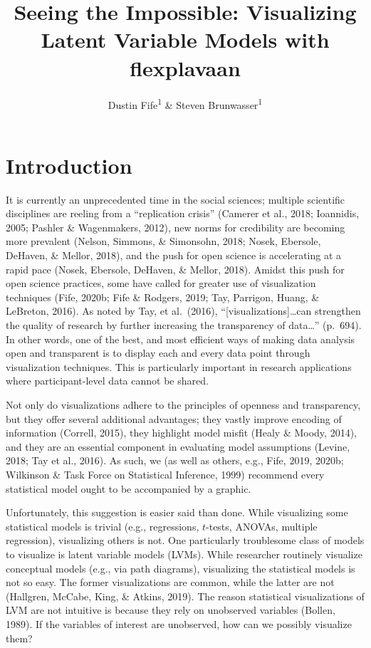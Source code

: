 \documentclass[
  english,
  doc]{apa6}
\title{Seeing the Impossible: Visualizing Latent Variable Models with flexplavaan}
\author{Dustin Fife\textsuperscript{1} \& Steven Brunwasser\textsuperscript{1}}
\date{}
\affiliation{\vspace{0.5cm}\textsuperscript{1} Rowan University}
\begin{document}
\maketitle

\hypertarget{introduction}{%
\section{Introduction}\label{introduction}}

It is currently an unprecedented time in the social sciences; multiple scientific disciplines are reeling from a ``replication crisis'' (Camerer et al., 2018; Ioannidis, 2005; Pashler \& Wagenmakers, 2012), new norms for credibility are becoming more prevalent (Nelson, Simmons, \& Simonsohn, 2018; Nosek, Ebersole, DeHaven, \& Mellor, 2018), and the push for open science is accelerating at a rapid pace (Nosek, Ebersole, DeHaven, \& Mellor, 2018). Amidst this push for open science practices, some have called for greater use of visualization techniques (Fife, 2020b; Fife \& Rodgers, 2019; Tay, Parrigon, Huang, \& LeBreton, 2016). As noted by Tay, et al.~(2016), ``{[}visualizations{]}\ldots can strengthen the quality of research by further increasing the transparency of data\ldots{}'' (p.~694). In other words, one of the best, and most efficient ways of making data analysis open and transparent is to display each and every data point through visualization techniques. This is particularly important in research applications where participant-level data cannot be shared.

Not only do visualizations adhere to the principles of openness and transparency, but they offer several additional advantages; they vastly improve encoding of information (Correll, 2015), they highlight model misfit (Healy \& Moody, 2014), and they are an essential component in evaluating model assumptions (Levine, 2018; Tay et al., 2016). As such, we (as well as others, e.g., Fife, 2019, 2020b; Wilkinson \& Task Force on Statistical Inference, 1999) recommend every statistical model ought to be accompanied by a graphic.

Unfortunately, this suggestion is easier said than done. While visualizing some statistical models is trivial (e.g., regressions, \(t\)-tests, ANOVAs, multiple regression), visualizing others is not. One particularly troublesome class of models to visualize is latent variable models (LVMs). While researcher routinely visualize conceptual models (e.g., via path diagrams), visualizing the statistical models is not so easy. The former visualizations are common, while the latter are not (Hallgren, McCabe, King, \& Atkins, 2019). The reason statistical visualizations of LVM are not intuitive is because they rely on unobserved variables (Bollen, 1989). If the variables of interest are unobserved, how can we possibly visualize them?
\end{document}
